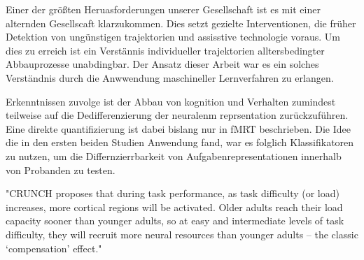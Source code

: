 
Einer der größten Heruasforderungen unserer Gesellschaft ist es mit einer alternden Gesellscaft klarzukommen. Dies setzt gezielte Interventionen, die früher Detektion von ungünstigen trajektorien und assisstive technologie voraus. Um dies zu erreich ist ein Verstännis individueller trajektorien alltersbedingter Abbauprozesse unabdingbar. Der Ansatz dieser Arbeit war es ein solches Verständnis durch die Anwwendung maschineller Lernverfahren zu erlangen. 

Erkenntnissen zuvolge ist der Abbau von kognition und Verhalten zumindest teilweise auf die Dedifferenzierung der neuralenm reprsentation zurückzuführen. Eine direkte quantifizierung ist dabei bislang nur in fMRT beschrieben. Die Idee die in den ersten beiden Studien Anwendung fand, war es folglich Klassifikatoren zu nutzen, um die Differnzierrbarkeit von Aufgabenrepresentationen innerhalb von Probanden zu testen.  
 

"CRUNCH proposes that during task performance, as task difficulty (or load) increases, more cortical regions will be activated. Older adults reach their load capacity sooner than younger adults, so at easy and intermediate levels of task difficulty, they will recruit more neural resources than younger adults – the classic ‘compensation’ effect."